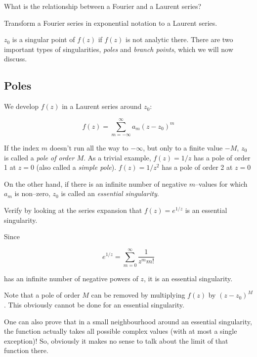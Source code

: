\begin{exer}
  What is the relationship between a Fourier and a Laurent series?
  \begin{hnt}
  Transform a Fourier series in exponential notation to a Laurent series.
  \end{hnt}
\end{exer}


\pagebreak



$z_0$ is a singular point of $f(z)$ if $f(z)$ is not analytic there. There are two important types of singularities, \emph{poles} and \emph{branch points}, which we will now discuss.

\subsection*{Poles}

We develop $f(z)$ in a Laurent series around $z_0$:

\begin{equation}
f(z)= \sum_{m=-\infty}^{\infty} a_m (z-z_0)^m
\end{equation} 

If the index $m$ doesn't run all the way to $-\infty$, but only to a finite value $-M$, $z_0$ is called a \emph{pole of order $M$}. As a trivial example, $f(z)=1/z$ has a pole of order 1 at $z=0$ (also called a \emph{simple pole}). $f(z)=1/z^2$ has a pole of order 2 at $z=0$

On the other hand, if there is an infinite number of negative $m$--values for which $a_m$ is non--zero, $z_0$ is called an \emph{essential singularity}.

\begin{cue}
  Verify by looking at the series expansion that $f(z)=e^{1/z}$ is an essential singularity.  
\end{cue}

Since

$$e^{1/z} = \sum_{m=0}^{\infty} \frac{1}{z^m m!} $$

has an infinite number of negative powers of $z$, it is an essential singularity.

Note that a pole of order $M$ can be removed by multiplying $f(z)$ by $(z-z_0)^M$. This obviously cannot be done for an essential singularity.

\noindent{}One can also prove that in a small neighbourhood around an essential singularity, the function actually takes all possible complex values (with at most a single exception)! So, obviously it makes no sense to talk about the limit of that function there.

